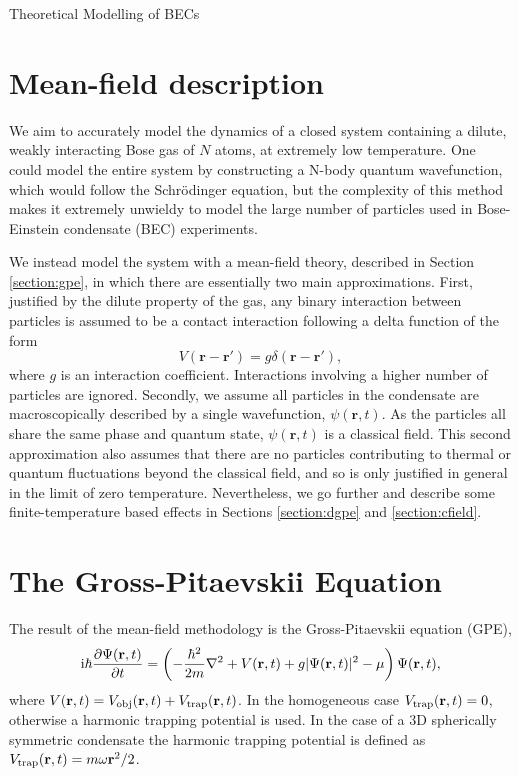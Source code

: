 \begin{chapter}{\label{cha:theoretical_model}Theoretical Modelling of BECs}
\section{\label{section:meanfield} Mean-field description}
We aim to accurately model the dynamics of a closed system containing a dilute, weakly interacting Bose gas of $N$ atoms, at extremely low temperature. One could model the entire system by constructing a N-body quantum wavefunction, which would follow the Schr\"odinger equation, but the complexity of this method makes it extremely unwieldy to model the large number of particles used in Bose-Einstein condensate (BEC) experiments.

We instead model the system with a mean-field theory, described in Section \ref{section:gpe}, in which there are essentially two main approximations. First, justified by the dilute property of the gas, any binary interaction between particles is assumed to be a contact interaction following a delta function of the form
\begin{equation*}
V(\mathbf{r}-\mathbf{r}') = g \delta(\mathbf{r}-\mathbf{r}'),
\end{equation*}
where $g$ is an interaction coefficient. Interactions involving a higher number of particles are ignored. Secondly, we assume all particles in the condensate are macroscopically described by a single wavefunction, $\psi(\mathbf{r},t)$. As the particles all share the same phase and quantum state, $\psi(\mathbf{r},t)$ is a classical field. This second approximation also assumes that there are no particles contributing to thermal or quantum fluctuations beyond the classical field, and so is only justified in general in the limit of zero temperature. Nevertheless, we go further and describe some finite-temperature based effects in Sections \ref{section:dgpe}
and \ref{section:cfield}.

\section{\label{section:gpe} The Gross-Pitaevskii Equation}
The result of the mean-field methodology is the Gross-Pitaevskii equation (GPE), 
\begin{equation}
\mathrm{i} \hbar \frac{\partial\Psi({\bf r},t)}{\partial t} = \left(-\frac{\hbar^2}{2m}\nabla^2 + V({\bf r},t) + g|\Psi({\bf r},t)|^2 - \mu \right) \Psi({\bf r},t),
\label{eq:gpe}
\end{equation}
where $V({\bf r},t) = V_{\mathrm{obj}}({\bf r},t) + V_{\mathrm{trap}}({\bf r},t)$. In the homogeneous case $V_{\mathrm{trap}}({\bf r},t)=0$, otherwise a harmonic trapping potential is used. In the case of a 3D spherically symmetric condensate the harmonic trapping potential is defined as $V_{\mathrm{trap}}({\bf r},t)=m\omega{\bf r}^2/2$.


\end{chapter}
